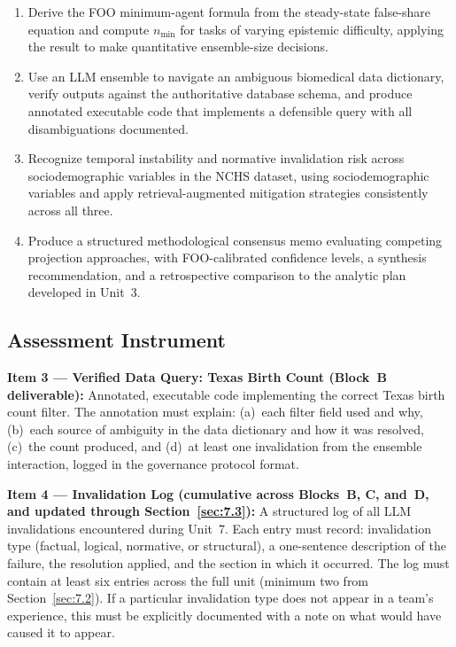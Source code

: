 \begin{enumerate}
    \item Derive the FOO minimum-agent formula from the steady-state
    false-share equation and compute $n_{\min}$ for tasks of
    varying epistemic difficulty, applying the result to make
    quantitative ensemble-size decisions.

    \item Use an LLM ensemble to navigate an ambiguous biomedical
    data dictionary, verify outputs against the authoritative
    database schema, and produce annotated executable code
    that implements a defensible query with all disambiguations
    documented.

    \item Recognize temporal instability and normative invalidation
    risk across sociodemographic variables in the NCHS dataset,
    using sociodemographic variables 
    and apply retrieval-augmented mitigation strategies
    consistently across all three.

    \item Produce a structured methodological consensus memo
    evaluating competing projection approaches, with
    FOO-calibrated confidence levels, a synthesis recommendation,
    and a retrospective comparison to the analytic plan developed
    in Unit~3.
\end{enumerate}

\subsection{Assessment Instrument}

\textbf{Item 3 --- Verified Data Query: Texas Birth Count
(Block~B deliverable):}
Annotated, executable code implementing the correct Texas birth
count filter. The annotation must explain: (a)~each filter field
used and why, (b)~each source of ambiguity in the data dictionary
and how it was resolved, (c)~the count produced, and (d)~at least
one invalidation from the ensemble interaction, logged in the
governance protocol format.

\textbf{Item 4 --- Invalidation Log (cumulative across Blocks~B,
C, and~D, and updated through Section~\ref{sec:7.3}):}
A structured log of all LLM invalidations encountered during
Unit~7. Each entry must record: invalidation type (factual,
logical, normative, or structural), a one-sentence description
of the failure, the resolution applied, and the section in which
it occurred. The log must contain at least six entries across
the full unit (minimum two from Section~\ref{sec:7.2}). If a
particular invalidation type does not appear in a team's
experience, this must be explicitly documented with a note on
what would have caused it to appear.

